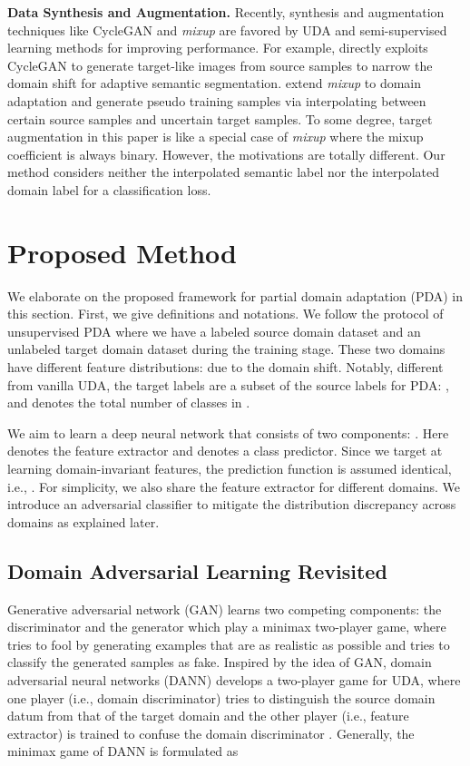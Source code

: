 \documentclass[runningheads]{llncs}
\begin{document}
\textbf{Data Synthesis and Augmentation.}
Recently, synthesis and augmentation techniques like CycleGAN \cite{zhu2017unpaired} and \emph{mixup} \cite{zhang2018mixup} are favored by UDA and semi-supervised learning methods for improving performance.
For example, \cite{hoffman2018cycada} directly exploits CycleGAN to generate target-like images from source samples to narrow the domain shift for adaptive semantic segmentation.
\cite{mao2019virtual,wang2019semi} extend \emph{mixup} to domain adaptation and generate pseudo training samples via interpolating between certain source samples and uncertain target samples.
To some degree, target augmentation in this paper is like a special case of \emph{mixup} where the mixup coefficient is always binary. 
However, the motivations are totally different. Our method considers neither the interpolated semantic label nor the interpolated domain label for a classification loss.

	
\section{Proposed Method}
We elaborate on the proposed framework for partial domain adaptation (PDA) in this section.
First, we give definitions and notations. 
We follow the protocol of unsupervised PDA where we have a labeled source domain dataset  and an unlabeled target domain dataset  during the training stage.
These two domains have different feature distributions:  due to the domain shift.
Notably, different from vanilla UDA, the target labels are a subset of the source labels for PDA: , and  denotes the total number of classes in .



We aim to learn a deep neural network  that consists of two components: . Here  denotes the feature extractor and  denotes a class predictor.
Since we target at learning domain-invariant features, the prediction function is assumed identical, i.e., .
For simplicity, we also share the feature extractor  for different domains.
We introduce an adversarial classifier  to mitigate the distribution discrepancy across domains as explained later.


\subsection{Domain Adversarial Learning Revisited}
Generative adversarial network (GAN) \cite{goodfellow2014generative} learns two competing components: the discriminator  and the generator  which play a minimax two-player game, where  tries to fool  by generating examples that are as realistic as possible and  tries to classify the generated samples as fake.
Inspired by the idea of GAN, domain adversarial neural networks (DANN) \cite{ganin2015unsupervised,ganin2016domain} develops a two-player game for UDA, where one player  (i.e., domain discriminator) tries to distinguish the source domain datum from that of the target domain and the other player  (i.e., feature extractor) is trained to confuse the domain discriminator .
Generally, the minimax game of DANN is formulated as
\end{document}
